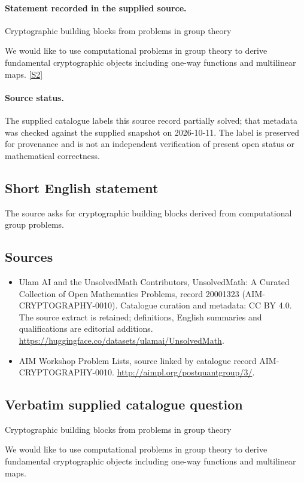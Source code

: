 \documentclass[11pt]{article}
\begin{document}
\paragraph{Statement recorded in the supplied source.}
Cryptographic building blocks from problems in group theory

We would like to use computational problems in group theory to derive fundamental cryptographic objects including one-way functions and multilinear maps. \href{http://aimpl.org/postquantgroup/3/}{[S2]}
\paragraph{Source status.}
The supplied catalogue labels this source record partially solved; that metadata was checked against the supplied snapshot on 2026-10-11. The label is preserved for provenance and is not an independent verification of present open status or mathematical correctness.
\subsection{Short English statement}
The source asks for cryptographic building blocks derived from computational group problems.
\subsection{Sources}
\begin{itemize}
\item[S1] Ulam AI and the UnsolvedMath Contributors, UnsolvedMath: A Curated Collection of Open Mathematics Problems, record 20001323 (AIM-CRYPTOGRAPHY-0010). Catalogue curation and metadata: CC BY 4.0. The source extract is retained; definitions, English summaries and qualifications are editorial additions.
\url{https://huggingface.co/datasets/ulamai/UnsolvedMath}.
\item[S2] AIM Workshop Problem Lists, source linked by catalogue record AIM-CRYPTOGRAPHY-0010.
\url{http://aimpl.org/postquantgroup/3/}.
\end{itemize}
\subsection{Verbatim supplied catalogue question}
Cryptographic building blocks from problems in group theory

We would like to use computational problems in group theory to derive fundamental cryptographic objects including one-way functions and multilinear maps.
\end{document}
